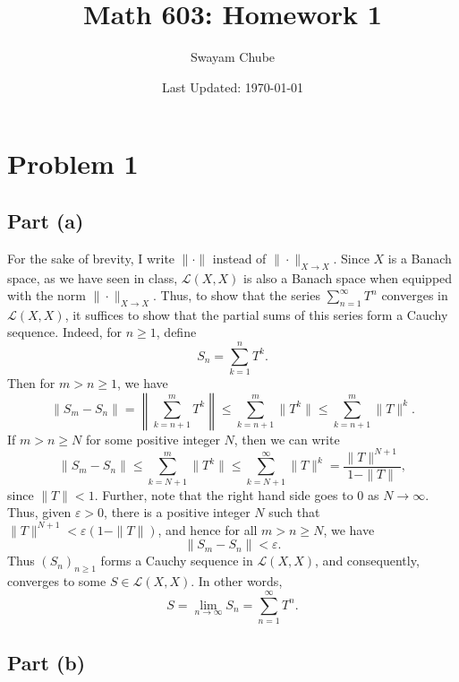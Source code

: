 \documentclass[11pt]{article}
\title{Math 603: Homework 1}
\author{Swayam Chube}
\date{Last Updated: \today}
\theoremstyle{thmstyle}
\theoremstyle{defstyle}
\renewcommand{\le}{\leqslant}
\renewcommand{\ge}{\geqslant}
\newcommand{\calL}{\mathcal{L}}
\begin{document}
\maketitle

\section{Problem 1}

\subsection{Part (a)}

For the sake of brevity, I write $\|\cdot\|$ instead of $\|\cdot\|_{X\to X}$. Since $X$ is a Banach space, as we have seen in class, $\calL(X, X)$ is also a Banach space when equipped with the norm $\|\cdot\|_{X\to X}$. Thus, to show that the series $\displaystyle\sum_{n = 1}^\infty T^n$ converges in $\calL(X, X)$, it suffices to show that the partial sums of this series form a Cauchy sequence. Indeed, for $n\ge 1$, define
\begin{equation*}
    S_n = \sum_{k = 1}^n T^k.
\end{equation*}
Then for $m > n\ge 1$, we have 
\begin{equation*}
    \|S_m - S_n\| = \left\|\sum_{k = n + 1}^m T^k\right\|\le\sum_{k = n + 1}^m \|T^k\|\le\sum_{k = n + 1}^m \|T\|^k.
\end{equation*}
If $m > n\ge N$ for some positive integer $N$, then we can write 
\begin{equation*}
    \|S_m - S_n\|\le\sum_{k = N + 1}^m \|T^k\|\le\sum_{k = N + 1}^\infty\|T\|^k = \frac{\|T\|^{N + 1}}{1 - \|T\|},
\end{equation*}
since $\|T\| < 1$. Further, note that the right hand side goes to $0$ as $N\to\infty$. Thus, given $\varepsilon > 0$, there is a positive integer $N$ such that $\|T\|^{N + 1} < \varepsilon\left(1 - \|T\|\right)$, and hence for all $m > n\ge N$, we have 
\begin{equation*}
    \|S_m - S_n\| < \varepsilon.
\end{equation*}
Thus $(S_n)_{n\ge 1}$ forms a Cauchy sequence in $\calL(X, X)$, and consequently, converges to some $S\in\calL(X, X)$. In other words,
\begin{equation*}
    S = \lim_{n\to\infty} S_n = \sum_{n = 1}^\infty T^n.
\end{equation*}

\subsection{Part (b)}
\end{document}
